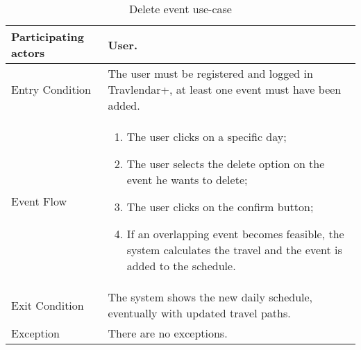 \begin{table}[H]
	\begin{center}
		\begin{tabular}{ | p{} | p{} | }
		\hline
		Participating actors &  User.\\
		\hline
		Entry Condition & The user must be registered and logged in Travlendar+, at least one event must have been added.\\
		\hline
		Event Flow & 
			\begin{enumerate}
				\item The user clicks on a specific day;
				\item The user selects the delete option on the event he wants to delete;
				\item The user clicks on the confirm button;
				\item If an overlapping event becomes feasible, the system calculates the travel and the event is added to the schedule.
			\end{enumerate} \\
		\hline
		Exit Condition & The system shows the new daily schedule, eventually with updated travel paths. \\
		\hline
		Exception & There are no exceptions.\\ 
		\hline
		\end{tabular}
	\end{center}
	\caption{Delete event use-case}
\end{table}